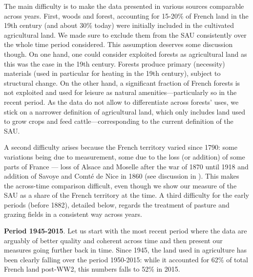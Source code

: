 \documentclass[11pt]{report}
\begin{document}
The main difficulty is to make the data presented in various sources comparable across years. First, woods and forest, accounting for 15-20\% of French land in the 19th century (and about 30\% today) were initially included in the cultivated agricultural land. We made sure to exclude them from the SAU consistently over the whole time period considered. This assumption deserves some discussion though. On one hand, one could consider exploited forests as agricultural land as this was the case in the 19th century. Forests produce primary (necessity) materials (used in particular for heating in the 19th century), subject to structural change. On the other hand, a significant fraction of French forests is not exploited and used for leisure as natural amenities---particularly so in the recent period. As the data do not allow to differentiate across forests' uses, we stick on a narrower definition of agricultural land, which only includes land used to grow crops and feed cattle---corresponding to the current definition of the SAU.

A second difficulty arises because the French territory varied since 1790: some variations being due to measurement, some due to the loss (or addition) of some parts of France --- loss of Alsace and Moselle after the war of 1870 until 1918 and addition of Savoye and Comté de Nice in 1860 (see discussion in \cite{auge1945statistiques}). This makes the across-time comparison difficult, even though we show our measure of the SAU as a share of the French territory at the time. A third difficulty for the early periods (before 1882), detailed below, regards the treatment of pasture and grazing fields in a consistent way across years.

\noindent \textbf{Period 1945-2015}. Let us start with the most recent period where the data are arguably of better quality and coherent across time and then present our measures going further back in time. Since 1945, the land used in agriculture has been clearly falling over the period 1950-2015: while it accounted for 62\% of total French land post-WW2, this numbers falls to 52\% in 2015. 

\end{document}
